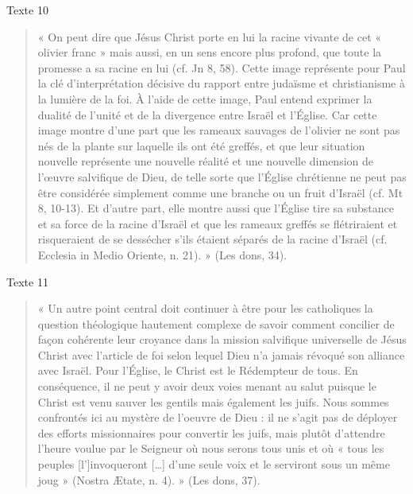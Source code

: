 Texte  10 \begin{quote}
    «    On  peut  dire  que  Jésus  Christ  porte  en  lui  la  racine  vivante  de  cet  «  olivier  franc  »  mais aussi,  en  un  sens  encore  plus  profond,  que  toute  la  promesse  a  sa  racine  en  lui  (cf.  Jn  8,  58). Cette  image  représente  pour  Paul  la  clé  d’interprétation  décisive  du  rapport  entre  judaïsme  et christianisme  à  la  lumière  de  la  foi.  À  l’aide  de  cette  image,  Paul  entend  exprimer  la  dualité de  l’unité  et  de  la  divergence  entre  Israël  et  l’Église.  Car  cette  image  montre  d’une  part  que les  rameaux  sauvages  de  l’olivier  ne  sont  pas  nés  de  la  plante  sur  laquelle  ils  ont  été  greffés,  et que  leur  situation  nouvelle  représente  une  nouvelle  réalité  et  une  nouvelle  dimension  de l’œuvre  salvifique  de  Dieu,  de  telle  sorte  que  l’Église  chrétienne  ne  peut  pas  être  considérée simplement  comme  une  branche  ou  un  fruit  d’Israël  (cf.  Mt  8,  10-13).  Et  d’autre  part,  elle montre  aussi  que  l’Église  tire  sa  substance  et  sa  force  de  la  racine  d’Israël  et  que  les  rameaux greffés  se  flétriraient  et  risqueraient  de  se  dessécher  s’ils  étaient  séparés  de  la  racine  d’Israël (cf.  Ecclesia in Medio Oriente, n. 21).  »  (Les  dons, 34).   
\end{quote} 

Texte  11 \begin{quote}
    «  Un  autre  point  central  doit  continuer  à  être  pour  les  catholiques  la  question  théologique hautement  complexe  de  savoir  comment  concilier  de  façon  cohérente  leur  croyance  dans  la mission  salvifique  universelle  de  Jésus  Christ  avec  l’article  de  foi  selon  lequel  Dieu  n’a jamais  révoqué  son  alliance  avec  Israël.  Pour  l’Église,  le  Christ  est  le  Rédempteur  de  tous.  En conséquence,  il  ne  peut  y  avoir  deux  voies  menant  au  salut  puisque  le  Christ  est  venu  sauver les  gentils  mais  également  les  juifs.  Nous  sommes  confrontés  ici  au  mystère  de  l’oeuvre  de Dieu  :  il  ne  s’agit  pas  de  déployer  des  efforts  missionnaires  pour  convertir  les  juifs,  mais plutôt  d’attendre  l’heure  voulue  par  le  Seigneur  où  nous  serons  tous  unis  et  où  «  tous  les peuples  [l’]invoqueront  […]  d’une  seule  voix  et  le  serviront  sous  un  même  joug  »  (Nostra Ætate, n. 4).  »  (Les  dons, 37). 
\end{quote}   

